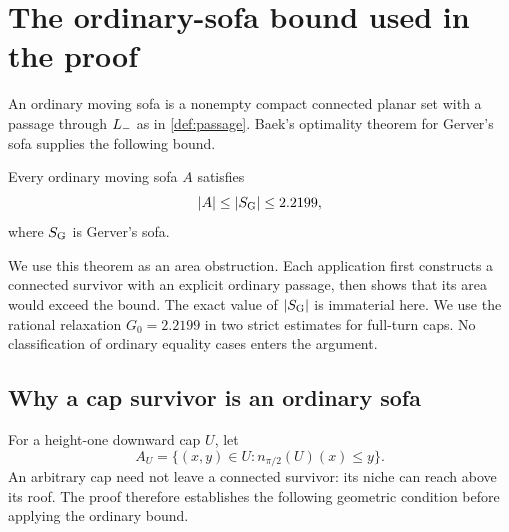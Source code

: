 \section{The ordinary-sofa bound used in the proof}\label{app:ordinary-sofa}

An ordinary moving sofa is a nonempty compact connected planar set
with a passage through $L_-$ as in \cref{def:passage}. Baek's
optimality theorem for Gerver's sofa supplies the following bound.

\begin{theorem}\label{thm:ordinary-sofa-bound}
Every ordinary moving sofa $A$ satisfies
\[
 |A|\le |S_{\rm G}|\le2.2199,
\]
where $S_{\rm G}$ is Gerver's sofa.
\end{theorem}

We use this theorem as an area obstruction. Each application first
constructs a connected survivor with an explicit ordinary passage, then
shows that its area would exceed the bound. The exact value of
$|S_{\rm G}|$ is immaterial here. We use the
rational relaxation $G_0=2.2199$ in two strict estimates for
full-turn caps. No classification of ordinary equality cases enters
the argument.

\subsection{Why a cap survivor is an ordinary sofa}

For a height-one downward cap $U$, let
\[
 A_U=\{(x,y)\in U:n_{\pi/2}(U)(x)\le y\}.
\]
An arbitrary cap need not leave a connected survivor: its niche can
reach above its roof. The proof therefore establishes the following
geometric condition before applying the ordinary bound.

